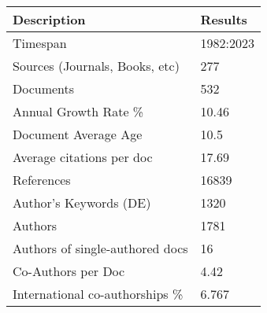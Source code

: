
\begin{tabular}{ll}
\toprule
Description & Results\\
\midrule
Timespan & 1982:2023\\
Sources (Journals, Books, etc) & 277\\
Documents & 532\\
Annual Growth Rate \% & 10.46\\
Document Average Age & 10.5\\
\addlinespace
Average citations per doc & 17.69\\
References & 16839\\
Author's Keywords (DE) & 1320\\
Authors & 1781\\
Authors of single-authored docs & 16\\
\addlinespace
Co-Authors per Doc & 4.42\\
International co-authorships \% & 6.767\\
\bottomrule
\end{tabular}